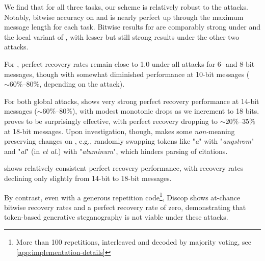 We find that for all three tasks, our scheme is relatively robust to the attacks. Notably, bitwise accuracy on \sg and \qa is nearly perfect up through the maximum message length for each task. Bitwise results for \lr are comparably strong under \rtt and the local variant of \llmp, with lesser but still strong results under the other two attacks.

For \qa, perfect recovery rates remain close to 1.0 under all attacks for 6- and 8-bit messages, though with somewhat diminished performance at 10-bit messages (${\sim}60\%$--$80\%$, depending on the attack).

For both global attacks, \lr shows very strong perfect recovery performance at 14-bit messages (${\sim}60\%$--$80\%$), with modest monotonic drops as we increment to 18 bits. \syn
proves to be surprisingly effective, with perfect recovery dropping to ${\sim}20\%$--$35\%$ at 18-bit messages. Upon investigation, though, \syn makes some \emph{non-}meaning preserving changes on \lr, e.g., randomly swapping tokens like "\textit{a}" with "\textit{angstrom}" and "\textit{al}" (in \emph{et al.}) with "\textit{aluminum}", which hinders parsing of citations.

\sg shows relatively consistent perfect recovery performance, with recovery rates declining only slightly from 14-bit to 18-bit messages.

By contrast, even with a generous repetition code\footnote{More than 100 repetitions, interleaved and decoded by majority voting, see \autoref{app:implementation-details}}, Discop shows at-chance bitwise recovery rates and a perfect recovery rate of zero, demonstrating that token-based generative steganography is not viable under these attacks.



